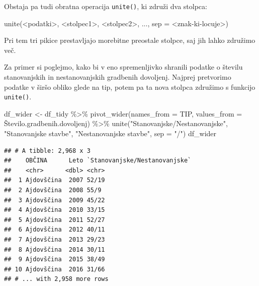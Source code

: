 \documentclass[
]{book}
\newenvironment{Shaded}{\begin{snugshade}}{\end{snugshade}}
\newcommand{\AttributeTok}[1]{\textcolor[rgb]{0.77,0.63,0.00}{#1}}
\newcommand{\FunctionTok}[1]{\textcolor[rgb]{0.00,0.00,0.00}{#1}}
\newcommand{\NormalTok}[1]{#1}
\newcommand{\OtherTok}[1]{\textcolor[rgb]{0.56,0.35,0.01}{#1}}
\newcommand{\SpecialCharTok}[1]{\textcolor[rgb]{0.00,0.00,0.00}{#1}}
\newcommand{\StringTok}[1]{\textcolor[rgb]{0.31,0.60,0.02}{#1}}
\begin{document}
Obstaja pa tudi obratna operacija \texttt{unite()}, ki združi dva stolpca:

\begin{Shaded}
\begin{Highlighting}[]
\FunctionTok{unite}\NormalTok{(}\SpecialCharTok{\textless{}}\NormalTok{podatki}\SpecialCharTok{\textgreater{}}\NormalTok{, }\SpecialCharTok{\textless{}}\NormalTok{stolpec1}\SpecialCharTok{\textgreater{}}\NormalTok{, }\SpecialCharTok{\textless{}}\NormalTok{stolpec2}\SpecialCharTok{\textgreater{}}\NormalTok{, ..., }\AttributeTok{sep =} \SpecialCharTok{\textless{}}\NormalTok{znak}\SpecialCharTok{{-}}\NormalTok{ki}\SpecialCharTok{{-}}\NormalTok{locuje}\SpecialCharTok{\textgreater{}}\NormalTok{)}
\end{Highlighting}
\end{Shaded}

Pri tem tri pikice prestavljajo morebitne preostale stolpce, saj jih lahko združimo več.

Za primer si poglejmo, kako bi v eno spremenljivko shranili podatke o številu stanovanjskih in nestanovanjskih gradbenih dovoljenj. Najprej pretvorimo podatke v širšo obliko glede na tip, potem pa ta nova stolpca združimo s funkcijo \texttt{unite()}.

\begin{Shaded}
\begin{Highlighting}[]
\NormalTok{df\_wider }\OtherTok{\textless{}{-}}\NormalTok{ df\_tidy }\SpecialCharTok{\%\textgreater{}\%}
  \FunctionTok{pivot\_wider}\NormalTok{(}\AttributeTok{names\_from =}\NormalTok{ TIP, }\AttributeTok{values\_from =}\NormalTok{ Število.gradbenih.dovoljenj) }\SpecialCharTok{\%\textgreater{}\%}
  \FunctionTok{unite}\NormalTok{(}\StringTok{"Stanovanjske/Nestanovanjske"}\NormalTok{, }
        \StringTok{"Stanovanjske stavbe"}\NormalTok{, }
        \StringTok{"Nestanovanjske stavbe"}\NormalTok{, }
        \AttributeTok{sep =} \StringTok{"/"}\NormalTok{)}
\NormalTok{df\_wider}
\end{Highlighting}
\end{Shaded}

\begin{verbatim}
## # A tibble: 2,968 x 3
##    OBČINA      Leto `Stanovanjske/Nestanovanjske`
##    <chr>      <dbl> <chr>                        
##  1 Ajdovščina  2007 52/19                        
##  2 Ajdovščina  2008 55/9                         
##  3 Ajdovščina  2009 45/22                        
##  4 Ajdovščina  2010 33/15                        
##  5 Ajdovščina  2011 52/27                        
##  6 Ajdovščina  2012 40/11                        
##  7 Ajdovščina  2013 29/23                        
##  8 Ajdovščina  2014 30/11                        
##  9 Ajdovščina  2015 38/49                        
## 10 Ajdovščina  2016 31/66                        
## # ... with 2,958 more rows
\end{verbatim}
\end{document}
